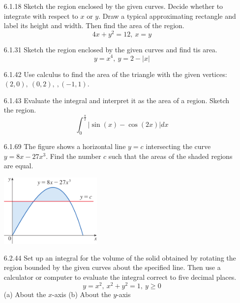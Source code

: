 \documentclass{article}
\begin{document}
\begin{enumerate}
\item[6.1.18]
    Sketch the region enclosed by the given curves. Decide whether to integrate with
    respect to $x$ or $y$. Draw a typical approximating rectangle and label its
    height and width. Then find the area of the region.
    \[
        4x+y^{2} = 12,\ x=y
    \]

\vspace{6cm}

\item[6.1.31]
    Sketch the region enclosed by the given curves and find tis area.
    \[
        y = x^{4},\ y = 2 - | x |
    \]

\vspace{6cm}

\item[6.1.42]
    Use calculus to find the area of the triangle with the given vertices:
    $(2, 0),\ (0, 2),\ , (-1, 1)$.

\newpage

\item[6.1.43]
    Evaluate the integral and interpret it as the area of a region. Sketch the
    region.
    \[
        \int_{0}^{\frac{\pi}{2}} | \sin (x) - \cos (2x) | dx
    \]

\vspace{8cm}

\item[6.1.69]
    The figure shows a horizontal line $y=c$ intersecting the curve $y=8x-27x^{3}$.
    Find the number $c$ such that the areas of the shaded regions are equal.

    \begin{center}
        \includegraphics[width=5cm]{./png/6.1.69.png}
    \end{center}

\newpage

\item[6.2.44]
    Set up an integral for the volume of the solid obtained by rotating the
    region bounded by the given curves about the specified line. Then use
    a calculator or computer to evaluate the integral correct to five decimal places.
    \[
        y = x^{2},\ x^{2} + y^{2} = 1,\ y \geqslant 0
    \]
    (a) About the $x$-axis (b) About the $y$-axis


\end{enumerate}
\end{document}
